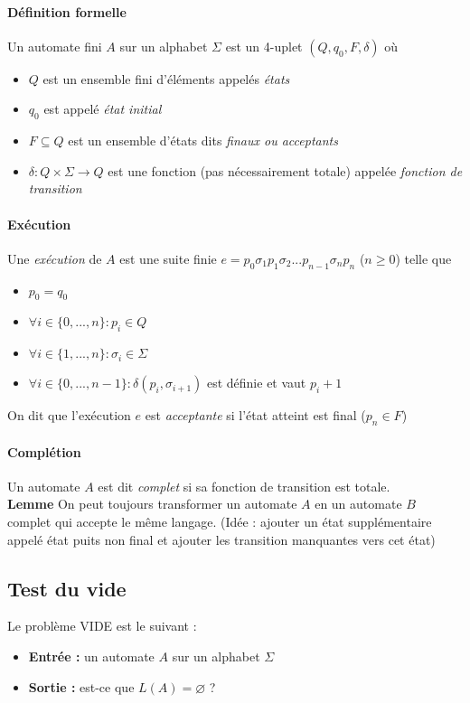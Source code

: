 \documentclass[a4paper]{article}
\begin{document}
  \paragraph{Définition formelle} Un automate fini $A$ sur un alphabet $\Sigma$
  est un 4-uplet $(Q, q_0, F, \delta)$ où
  \begin{itemize}
    \item $Q$ est un ensemble fini d'éléments appelés \textit{états}
    \item $q_0$ est appelé \textit{état initial}
    \item $F \subseteq Q$ est un ensemble d'états dits \textit{finaux ou acceptants}
    \item $\delta : Q \times \Sigma \rightarrow Q $ est une fonction (pas nécessairement totale)
    appelée \textit{fonction de transition}
  \end{itemize}

  \paragraph{Exécution} Une \textit{exécution} de $A$ est une suite finie 
  $e = p_0 \sigma_1 p_1 \sigma_2 ... p_{n-1} \sigma_n p_n$ ($n \geq 0$) telle que
  \begin{itemize}
    \item $p_0 = q_0$
    \item $\forall i \in \{0,...,n\} : p_i \in Q$
    \item $\forall i \in \{1,...,n\} : \sigma_i \in \Sigma$
    \item $\forall i \in \{0,...,n-1\} : \delta(p_i, \sigma_{i+1})$ est définie
    et vaut $p_i+1$
  \end{itemize}
  On dit que l'exécution $e$ est \textit{acceptante} si l'état atteint est final ($p_n \in F$)

  \paragraph{Complétion} Un automate $A$ est dit \textit{complet} si sa fonction de
  transition est totale.\\

  \textbf{Lemme} On peut toujours transformer un automate $A$ en un automate $B$
  complet qui accepte le même langage. (Idée : ajouter un état supplémentaire 
  appelé état puits non final et ajouter les transition manquantes vers cet état)

  \subsection{Test du vide}
  Le problème VIDE est le suivant :
  \begin{itemize}
    \item \textbf{Entrée :} un automate $A$ sur un alphabet $\Sigma$
    \item \textbf{Sortie :} est-ce que $L(A) = \varnothing$ ?
  \end{itemize}
\end{document}
